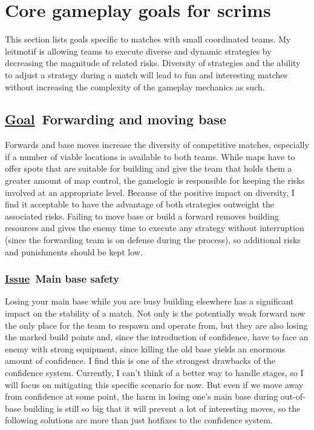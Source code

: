\documentclass{scrartcl}
\newcommand{\goal}     [0]{\textbf{\underline{Goal}\ }}
\newcommand{\issue}    [0]{\textbf{\underline{Issue}\ }}
\begin{document}
\section{Core gameplay goals for scrims}
\label{core-gameplay-goals-for-scrims}

This section lists goals specific to matches with small coordinated teams. My leitmotif is allowing teams to execute diverse and dynamic strategies by decreasing the magnitude of related risks. Diversity of strategies and the ability to adjust a strategy during a match will lead to fun and interesting matches without increasing the complexity of the gameplay mechanics as such.

\subsection{\goal Forwarding and moving base}

Forwards and base moves increase the diversity of competitive matches, especially if a number of viable locations is available to both teams. While maps have to offer spots that are suitable for building and give the team that holds them a greater amount of map control, the gamelogic is responsible for keeping the risks involved at an appropriate level. Because of the positive impact on diversity, I find it acceptable to have the advantage of both strategies outweight the associated risks. Failing to move base or build a forward removes building resources and gives the enemy time to execute any strategy without interruption (since the forwarding team is on defense during the process), so additional risks and punishments should be kept low.

\subsubsection{\issue Main base safety}

Losing your main base while you are busy building elsewhere has a significant impact on the stability of a match. Not only is the potentially weak forward now the only place for the team to respawn and operate from, but they are also losing the marked build points and, since the introduction of confidence, have to face an enemy with strong equipment, since killing the old base yields an enormous amount of confidence. I find this is one of the strongest drawbacks of the confidence system. Currently, I can't think of a better way to handle stages, so I will focus on mitigating this specific scenario for now. But even if we move away from confidence at some point, the harm in losing one's main base during out-of-base building is still so big that it will prevent a lot of interesting moves, so the following solutions are more than just hotfixes to the confidence system.
\end{document}
